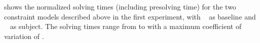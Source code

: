  shows the
normalized solving times (including \gls{presolving} time) for the two
\glspl{constraint model} described above in the first experiment, with
~\modelA{} as \gls{baseline} and ~\modelB{} as \gls{subject}.
%
The solving times range from
\printMinSolvingTime{
  \SolvTechDisableDomMatchesPrePlusSolvingTimeSpeedupAllPrePlusSolvingTimeAvgMin,
  \SolvTechDisableDomMatchesPrePlusSolvingTimeSpeedupPrePlusSolvingTimeAvgMin,
  \SolvTechDisableIllegalMatchesUncoveredOpsPrePlusSolvingTimeSpeedupPrePlusSolvingTimeAvgMin,
  \SolvTechDisableIllegalMatchesUndefinedDataPrePlusSolvingTimeSpeedupPrePlusSolvingTimeAvgMin,
  \SolvTechDisableIllegalMatchesKillsPrePlusSolvingTimeSpeedupPrePlusSolvingTimeAvgMin,
  \SolvTechDisableIllegalMatchesDefLocsPrePlusSolvingTimeSpeedupPrePlusSolvingTimeAvgMin,
  \SolvTechDisableIllegalMatchesUseLocsPrePlusSolvingTimeSpeedupPrePlusSolvingTimeAvgMin,
  \SolvTechDisableRedunKillsPrePlusSolvingTimeSpeedupPrePlusSolvingTimeAvgMin,
  \SolvTechDisableRedunNonNullCopyMatchesPrePlusSolvingTimeSpeedupPrePlusSolvingTimeAvgMin,
  \SolvTechDisableCanonicalLocsPrePlusSolvingTimeSpeedupPrePlusSolvingTimeAvgMin
} to
\printMaxSolvingTime{
  \SolvTechDisableDomMatchesPrePlusSolvingTimeSpeedupAllPrePlusSolvingTimeAvgMax,
  \SolvTechDisableDomMatchesPrePlusSolvingTimeSpeedupPrePlusSolvingTimeAvgMax,
  \SolvTechDisableIllegalMatchesUncoveredOpsPrePlusSolvingTimeSpeedupPrePlusSolvingTimeAvgMax,
  \SolvTechDisableIllegalMatchesUndefinedDataPrePlusSolvingTimeSpeedupPrePlusSolvingTimeAvgMax,
  \SolvTechDisableIllegalMatchesKillsPrePlusSolvingTimeSpeedupPrePlusSolvingTimeAvgMax,
  \SolvTechDisableIllegalMatchesDefLocsPrePlusSolvingTimeSpeedupPrePlusSolvingTimeAvgMax,
  \SolvTechDisableIllegalMatchesUseLocsPrePlusSolvingTimeSpeedupPrePlusSolvingTimeAvgMax,
  \SolvTechDisableRedunKillsPrePlusSolvingTimeSpeedupPrePlusSolvingTimeAvgMax,
  \SolvTechDisableRedunNonNullCopyMatchesPrePlusSolvingTimeSpeedupPrePlusSolvingTimeAvgMax,
  \SolvTechDisableCanonicalLocsPrePlusSolvingTimeSpeedupPrePlusSolvingTimeAvgMax
} with a maximum coefficient of variation of
\numMaxOf{
  \SolvTechDisableDomMatchesPrePlusSolvingTimeSpeedupAllPrePlusSolvingTimeCvMax,
  \SolvTechDisableDomMatchesPrePlusSolvingTimeSpeedupPrePlusSolvingTimeCvMax,
  \SolvTechDisableIllegalMatchesUncoveredOpsPrePlusSolvingTimeSpeedupPrePlusSolvingTimeCvMax,
  \SolvTechDisableIllegalMatchesUndefinedDataPrePlusSolvingTimeSpeedupPrePlusSolvingTimeCvMax,
  \SolvTechDisableIllegalMatchesKillsPrePlusSolvingTimeSpeedupPrePlusSolvingTimeCvMax,
  \SolvTechDisableIllegalMatchesDefLocsPrePlusSolvingTimeSpeedupPrePlusSolvingTimeCvMax,
  \SolvTechDisableIllegalMatchesUseLocsPrePlusSolvingTimeSpeedupPrePlusSolvingTimeCvMax,
  \SolvTechDisableRedunKillsPrePlusSolvingTimeSpeedupPrePlusSolvingTimeCvMax,
  \SolvTechDisableRedunNonNullCopyMatchesPrePlusSolvingTimeSpeedupPrePlusSolvingTimeCvMax,
  \SolvTechDisableCanonicalLocsPrePlusSolvingTimeSpeedupPrePlusSolvingTimeCvMax
}.
